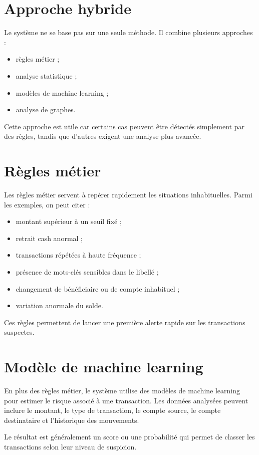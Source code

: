 ﻿\documentclass[12pt,a4paper]{report}
\begin{document}
\section{Approche hybride}
Le système ne se base pas sur une seule méthode. Il combine plusieurs approches :
\begin{itemize}[leftmargin=1.5em]
    \item règles métier ;
    \item analyse statistique ;
    \item modèles de machine learning ;
    \item analyse de graphes.
\end{itemize}

Cette approche est utile car certains cas peuvent être détectés simplement par des règles, tandis que d'autres exigent une analyse plus avancée.

\section{Règles métier}
Les règles métier servent à repérer rapidement les situations inhabituelles. Parmi les exemples, on peut citer :
\begin{itemize}[leftmargin=1.5em]
    \item montant supérieur à un seuil fixé ;
    \item retrait cash anormal ;
    \item transactions répétées à haute fréquence ;
    \item présence de mots-clés sensibles dans le libellé ;
    \item changement de bénéficiaire ou de compte inhabituel ;
    \item variation anormale du solde.
\end{itemize}

Ces règles permettent de lancer une première alerte rapide sur les transactions suspectes.

\section{Modèle de machine learning}
En plus des règles métier, le système utilise des modèles de machine learning pour estimer le risque associé à une transaction. Les données analysées peuvent inclure le montant, le type de transaction, le compte source, le compte destinataire et l'historique des mouvements.

Le résultat est généralement un score ou une probabilité qui permet de classer les transactions selon leur niveau de suspicion.
\end{document}
